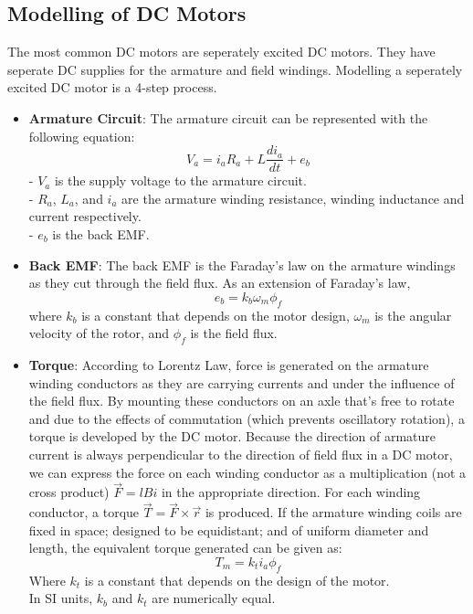 \documentclass[a4paper]{article}
\begin{document}
\subsection{Modelling of DC Motors}
The most common DC motors are seperately excited DC motors. 
They have seperate DC supplies for the armature and field windings.
Modelling a seperately excited DC motor is a 4-step process.

\begin{itemize}

    \item \textbf{Armature Circuit}: 
            The armature circuit can be represented with the following equation:
            $$ V_{a}= i_{a} R_{a} + L\frac{di_{a}}{dt} + e_{b} $$
            - $V_{a}$ is the supply voltage to the armature circuit.\\
            - $R_{a}$, $L_{a}$, and $i_{a}$ are the armature winding resistance, winding inductance and current respectively.\\
            - $e_{b}$ is the back EMF.

    \item \textbf{Back EMF}:
            The back EMF is the Faraday's law on the armature windings as they cut through the field flux. 
            As an extension of Faraday's law, 
            $$e_{b}= k_{b} \omega_{m} \phi_{f} $$ 
            where $k_{b}$ is a constant that depends on the motor design, $\omega_{m}$ is the angular velocity of the rotor, 
            and $\phi_{f}$ is the field flux.

    \item \textbf{Torque}:
            According to Lorentz Law, force is generated on the armature winding conductors as they are carrying currents and under 
            the influence of the field flux. By mounting these conductors on an axle that's free to rotate and due to the effects of 
            commutation (which prevents oscillatory rotation), a torque is developed by the DC motor. Because the direction of armature 
            current is always perpendicular to the direction of field flux in a DC motor, we can express the force on each winding 
            conductor as a multiplication (not a cross product) $\vec{F}= l B i$ in the appropriate direction. 
            For each winding conductor, a torque $\vec{T}= \vec{F} \times \vec{r} $ is produced. If the armature winding coils are 
            fixed in space; designed to be equidistant; and of uniform diameter and length, the equivalent torque generated can be given as: 
            $$ T_{m}= k_{t} i_{a} \phi_{f} $$
            Where $k_{t}$ is a constant that depends on the design of the motor.\\
            In SI units, $k_{b}$ and $k_{t}$ are numerically equal.


\end{itemize}
\end{document}
